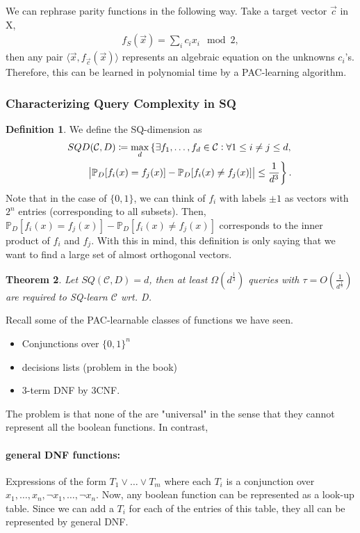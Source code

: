 \documentclass[12pt, letterpaper]{article}
\numberwithin{equation}{section} %
\newcommand{\mb}{\mathbb}
\newcommand{\mc}{\mathcal}
\newtheorem{theorem}{Theorem}[section]
\theoremstyle{definition}
\newtheorem{definition}[theorem]{Definition}
\theoremstyle{remark}
\begin{document}
We can rephrase parity functions in the following way. Take a target vector $\vec c$ in X,
\begin{align}
f_S(\vec x) = \sum_ic_ix_i \mod 2,
\end{align}
then any pair  $\langle \vec x, f_{\vec c}(\vec x)\rangle$ represents an algebraic equation on the unknowns $c_i$'s. Therefore, this can be learned in polynomial time by a PAC-learning algorithm.

\subsubsection{Characterizing Query Complexity in SQ}
\begin{definition}
We define the SQ-dimension as
\begin{multline}
SQD(\mc C, D) \coloneqq \max_d \left\{ \exists f_1,\ldots,f_d\in \mc C : \forall 1\leq i \ne j\leq d,\right.\\
\quad\quad \left.\abs{\mb P_D[f_i(x)=f_j(x)] - \mb P_D[f_i(x)\ne f_j(x)]}\leq \frac1{d^3}\right\}.
\end{multline}
Note that in the case of $\lbrace 0, 1\rbrace$, we can think of $f_i$ with labels $\pm 1$ as vectors with $2^n$ entries (corresponding to all subsets). Then, $\mb P_D[f_i(x)=f_j(x)]  - \mb P_D[f_i(x)\ne f_j(x)]$ corresponds to the inner product of $f_i$ and $f_j$. With this in mind, this definition is only saying that we want to find a large set of almost orthogonal vectors.
\end{definition}

\begin{theorem}
Let $SQ(\mc C, D)=d$, then at least $\Omega\left(d^\frac13\right)$ queries with $\tau = O\left(\frac1{d^\frac13}\right)$ are required to SQ-learn $\mc C$ wrt. D.
\end{theorem}

Recall some of the PAC-learnable classes of functions we have seen.
\begin{itemize}
\item Conjunctions over $\lbrace 0, 1\rbrace^n$
\item decisions lists (problem in the book)
\item 3-term DNF by 3CNF.
\end{itemize}
The problem is that none of the are "universal" in the sense that they cannot represent all the boolean functions. In contrast, 
\paragraph{general DNF functions:} Expressions of the form $T_1\lor\ldots\lor T_m$ where each $T_i$ is a conjunction over $x_1,\ldots,x_n,\lnot x_1,\ldots,\lnot x_n$. Now, any boolean function can be represented as a look-up table. Since we can add a $T_i$ for each of the entries of this table, they all can be represented by general DNF.
\end{document}
